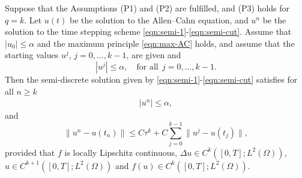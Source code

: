 \documentclass[10pt,final,leqno,onefignum,onetabnum]{siamltex}%
\def\leq{\leqslant}
\def\II{(\Omega)}
\begin{document}
\begin{theorem}\label{thm:semi}
Suppose that the Assumptions (P1) and (P2) are fulfilled, and (P3) holds for $q=k$.
Let $u(t)$ be the solution to the Allen--Cahn equation, and $u^n$ be the solution to the time stepping scheme
\eqref{eqn:semi-1}-\eqref{eqn:semi-cut}.
Assume that $|u_0|\le \alpha$ and the maximum principle \eqref{eqn:max-AC} holds,
and assume that the starting values $u^j$, $j=0,\dots,k-1$, are given and
$$
|u^j|\le \alpha, \quad \text{for all}~~j=0,\dots,k-1.
$$
Then the semi-discrete solution given by  \eqref{eqn:semi-1}-\eqref{eqn:semi-cut} satisfies for all $n\ge k$
\begin{align*}%
|u^n|\le \alpha,
\end{align*}
and
\begin{equation*}%
\|u^n - u(t_n)\|\leq C\tau^k + C\sum_{j=0}^{k-1}\|u^j - u(t_j)\|,
\end{equation*}
provided that  $f$ is locally Lipschitz continuous, $\Delta u\in C^{k}([0,T]; L^2\II)$, $ u\in C^{k+1}([0,T];L^2\II)$ and $f(u) \in C^k([0,T];L^2\II)$.
\end{theorem}
\end{document}
